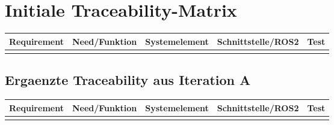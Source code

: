 \chapter{Initiale Traceability-Matrix}

\begin{longtable}{L{0.15\textwidth} L{0.18\textwidth} L{0.20\textwidth} L{0.20\textwidth} L{0.14\textwidth}}
\toprule
Requirement & Need/Funktion & Systemelement & Schnittstelle/ROS2 & Test \\
\midrule
{}
\bottomrule
\end{longtable}

\section{Ergaenzte Traceability aus Iteration A}

\begin{longtable}{L{0.15\textwidth} L{0.18\textwidth} L{0.20\textwidth} L{0.20\textwidth} L{0.14\textwidth}}
\toprule
Requirement & Need/Funktion & Systemelement & Schnittstelle/ROS2 & Test \\
\midrule
{}
\bottomrule
\end{longtable}
